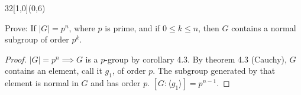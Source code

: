 \documentclass[12pt]{article}
\newenvironment{exercise}[2]{\begin{textblock}{32}[1,0](0,#2)\noindent#1\end{textblock}}{\vspace{1in}}
\begin{document}

  \begin{exercise}{4.2}{6}
    {\noindent}Prove: If $|G|=p^n$, where $p$ is prime, and if $0\le k\le n$, then $G$ contains a normal subgroup of order $p^k$.

    \begin{proof}
      $|G|=p^n\implies G$ is a $p$-group by corollary 4.3.
      By theorem 4.3 (Cauchy), $G$ contains an element, call it $g_1$, of order $p$.
      The subgroup generated by that element is normal in $G$ and has order $p$.
      $[G:\langle g_1 \rangle]=p^{n-1}$.
    \end{proof}
  \end{exercise}


\end{document}
